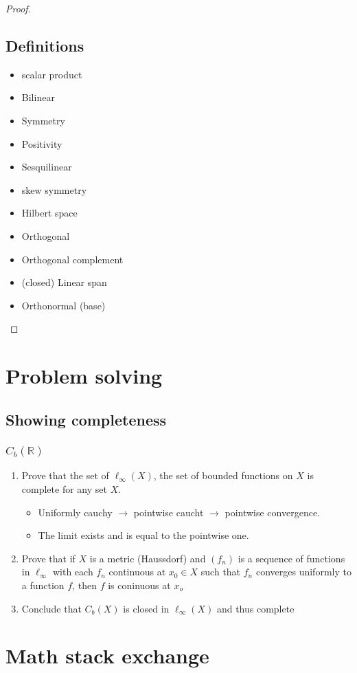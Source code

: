 \documentclass[titlepage]{article}
\begin{document}
\begin{proof}
\subsection{Definitions}
\begin{itemize}
\item scalar product
\item Bilinear
\item Symmetry 
\item Positivity
\item Sesquilinear
\item skew symmetry
\item Hilbert space
\item Orthogonal
\item Orthogonal complement
\item (closed) Linear span
\item Orthonormal (base)
\end{itemize}

\end{proof}

\section{Problem solving}
\subsection{Showing completeness}
\subsubsection{$C_b(\mathbb{R})$}
\begin{enumerate}
\item Prove that the set of $\ell_\infty(X)$, the set of bounded functions on $X$ is complete for any set $X$.
\begin{itemize}
\item Uniformly cauchy $\rightarrow$ pointwise caucht $\rightarrow$ pointwise convergence.
\item The limit exists and is equal to the pointwise one.
\end{itemize}
\item Prove that if $X$ is a metric (Haussdorf) and $(f_n)$ is a sequence of functions in $\ell_\infty$ with each $f_n$ continuous at $x_0\in X$ such that $f_n$ converges uniformly to a function $f$, then $f$ is coninuous at $x_o$
\item Conclude that $C_b(X)$ is closed in $\ell_\infty(X)$ and thus complete
\end{enumerate}


\section{Math stack exchange}
\end{document}

